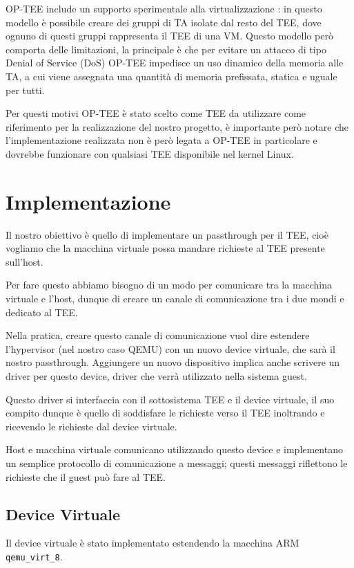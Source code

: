 \documentclass[12pt,italian]{report}
\begin{document}
OP-TEE include un supporto sperimentale alla virtualizzazione
\cite{optee_virtualization}: in questo
modello è possibile creare dei gruppi di TA isolate dal resto del TEE,
dove ognuno di questi gruppi rappresenta il TEE di una VM.
Questo modello però comporta delle limitazioni, la principale è che
per evitare un attacco di tipo Denial of Service (DoS) OP-TEE impedisce
un uso dinamico della memoria alle TA, a cui viene assegnata una quantità
di memoria prefissata, statica e uguale per tutti.

Per questi motivi OP-TEE è stato scelto come TEE da utilizzare
come riferimento per la realizzazione del nostro progetto, è
importante però notare che l'implementazione realizzata non è però
legata a OP-TEE in particolare e dovrebbe funzionare con qualsiasi
TEE disponibile nel kernel Linux.

\section{Implementazione}
\label{sec:implementazione}
Il nostro obiettivo è quello di implementare un passthrough per il TEE,
cioè vogliamo che la macchina virtuale possa mandare richieste al TEE
presente sull'host.

Per fare questo abbiamo bisogno di un modo per comunicare tra la macchina
virtuale e l'host, dunque di creare un canale di comunicazione tra i due
mondi e dedicato al TEE.

Nella pratica, creare questo canale di comunicazione vuol dire estendere
l'hypervisor (nel nostro caso QEMU) con un nuovo device virtuale, che sarà
il nostro passthrough.
Aggiungere un nuovo dispositivo implica anche scrivere un driver per
questo device, driver che verrà utilizzato nella sistema guest.

Questo driver si interfaccia con il sottosistema TEE e il device virtuale,
il suo compito dunque è quello di soddisfare le richieste verso il TEE
inoltrando e ricevendo le richieste dal device virtuale.

Host e macchina virtuale comunicano utilizzando questo device e implementano
un semplice protocollo di comunicazione a messaggi; questi messaggi
riflettono le richieste che il guest può fare al TEE. 

\subsection{Device Virtuale}
Il device virtuale è stato implementato estendendo la macchina ARM
\texttt{qemu\_virt\_8}. 
\end{document}

